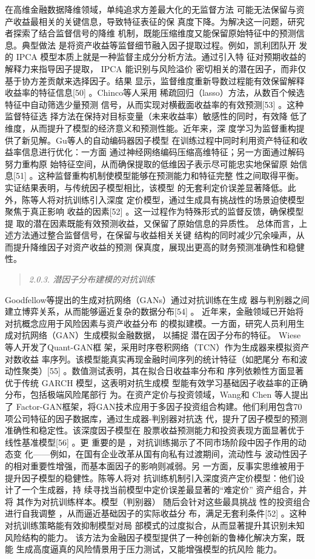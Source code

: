 \documentclass[UTF8]{ctexart}
\begin{document}
在高维金融数据降维领域，单纯追求方差最大化的无监督方法
可能无法保留与资产收益最相关的关键信息，导致特征表征的保
真度下降。为解决这一问题，研究者探索了结合监督信号的降维
机制，既能压缩维度又能保留原始特征中的预测信息。典型做法
是将资产收益等监督细节融入因子提取过程。例如，凯利团队开 发的 IPCA
模型本质上就是一种监督主成分分析方法。通过引入特
征对预期收益的解释力来指导因子提取， IPCA 能识别与风险溢价
密切相关的潜在因子，而非仅基于协方差贡献来选择因子。结果
显示，监督维度重新导数过程能有效保留解释收益率的特征信息{[}50{]}
。Chinco等人采用
稀疏回归（lasso）方法，从数百个候选特征中自动筛选少量预测
信号，从而实现对横截面收益率的有效预测{[}53{]} 。这种监督特征选
择方法在保持对目标变量（未来收益率）敏感性的同时，有效降
低了维度，从而提升了模型的经济意义和预测性能。近年来，深
度学习为监督重构提供了新见解。Gu等人的自动编码器因子模型
在训练过程中同时利用资产特征和收益率信息进行优化：一方面
通过神经网络编码压缩高维特征；另一方面通过解码努力重构原
始特征空间，从而确保提取的低维因子表示尽可能忠实地保留原 始信息{[}51{]}
。这种监督重构机制使模型能够在预测能力和特征完整
性之间取得平衡。实证结果表明，与传统因子模型相比，该模型
的无套利定价误差显著降低。此外，陈等人将对抗训练引入深度
定价模型，通过生成具有挑战性的场景迫使模型聚焦于真正影响
收益的因素{[}52{]} 。这一过程作为特殊形式的监督反馈，确保模型提
取的潜在因素既能有效预测收益，又保留了原始信息的异质性。
总体而言，上述方法通过整合监督信号，在保留与收益相关关键
结构的同时减少冗余噪声，从而提升降维因子对资产收益的预测
保真度，展现出更高的财务预测准确性和稳健性。

\begin{quote}
\emph{2.0.3. 潜因子分布建模的对抗训练}
\end{quote}

Goodfellow等提出的生成对抗网络（GANs）通过对抗训练在生成
器与判别器之间建立博弈关系，从而能够逼近复杂的数据分布{[}54{]} 。
近年来，金融领域已开始将对抗概念应用于风险因素与资产收益分布
的模拟建模。一方面，研究人员利用生成对抗网络（GAN）生成模拟金融数据，
以捕捉 潜在因子分布的特征。 Wiese 等人开发了Quant-GAN框
架，采用时序卷积网络（TCN）作为生成器来模拟资产对数收益
率序列。该模型能真实再现金融时间序列的统计特征（如肥尾分
布和波动性聚类）{[}55{]} 。数值测试表明，其在拟合日收益率分布和
序列依赖性方面显著优于传统 GARCH 模型，这表明对抗生成模
型能有效学习基础因子收益率的正确分布，包括极端风险尾部行
为。在资产定价与投资领域，Wang和 Chen 等人提出了
Factor-GAN框架，将GAN技术应用于多因子投资组合构建。他们利用包含70项公司特征的因子数据库，通过生成器-判别器对抗迭
代，提升了因子模型的预测准确性和稳定性。该深度因子模型在
股票收益预测能力和投资表现方面显著优于线性基准模型{[}56{]} 。更 重要的是
，对抗训练揭示了不同市场阶段中因子作用的动态变
化------例如，在国有企业改革从国有向私有过渡期间，流动性与
波动性因子的相对重要性增强，而基本面因子的影响则减弱。另
一方面，反事实思维被用于提升因子模型的稳健性。陈等人将对
抗训练机制引入深度资产定价模型：他们设计了一个生成器，持
续寻找当前模型中定价误差最显著的``难定价'' 资产组合，并将
其作为对抗训练样本。模型（判别器） 随后会针对这些最具挑战
性的投资组合进行自我调整 ，从而逼近基础因子的实际收益分
布，满足无套利条件{[}52{]} 。这种对抗训练策略能有效抑制模型对局
部模式的过度拟合，从而显著提升其识别未知风险结构的能力。
该方法为金融因子模型提供了一种创新的鲁棒化解决方案，既能
生成高度逼真的风险情景用于压力测试，又能增强模型的抗风险 能力。
\end{document}
